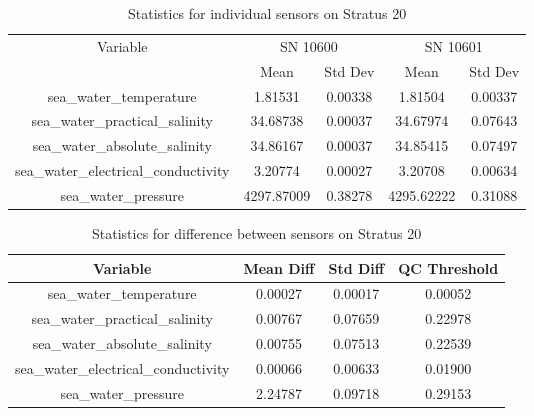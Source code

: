 \begin{table}[h]
\centering
\begin{tabular}{|c|c|c|c|c|}
\hline
Variable & \multicolumn{2}{c|}{SN 10600} & \multicolumn{2}{c|}{SN 10601} \\
& Mean & Std Dev & Mean & Std Dev \\
\hline
sea\_water\_temperature & 1.81531 & 0.00338 & 1.81504 & 0.00337 \\
sea\_water\_practical\_salinity & 34.68738 & 0.00037 & 34.67974 & 0.07643 \\
sea\_water\_absolute\_salinity & 34.86167 & 0.00037 & 34.85415 & 0.07497 \\
sea\_water\_electrical\_conductivity & 3.20774 & 0.00027 & 3.20708 & 0.00634 \\
sea\_water\_pressure & 4297.87009 & 0.38278 & 4295.62222 & 0.31088 \\
\hline
\end{tabular}
\caption{Statistics for individual sensors on Stratus 20}
\end{table}

\begin{table}[h]
\centering
\begin{tabular}{|c|c|c|c|}
\hline
Variable & Mean Diff & Std Diff & QC Threshold \\
\hline
sea\_water\_temperature & 0.00027 & 0.00017 & 0.00052 \\
sea\_water\_practical\_salinity & 0.00767 & 0.07659 & 0.22978 \\
sea\_water\_absolute\_salinity & 0.00755 & 0.07513 & 0.22539 \\
sea\_water\_electrical\_conductivity & 0.00066 & 0.00633 & 0.01900 \\
sea\_water\_pressure & 2.24787 & 0.09718 & 0.29153 \\
\hline
\end{tabular}
\caption{Statistics for difference between sensors on Stratus 20}
\end{table}
